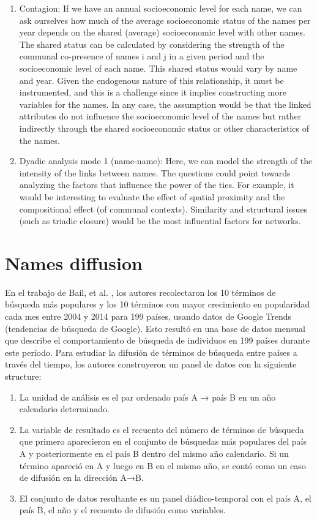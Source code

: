 \begin{enumerate}
    \item Contagion: If we have an annual socioeconomic level for each name, we can ask ourselves how much of the average socioeconomic status of the names per year depends on the shared (average) socioeconomic level with other names. The shared status can be calculated by considering the strength of the communal co-presence of names i and j in a given period and the socioeconomic level of each name. This shared status would vary by name and year. Given the endogenous nature of this relationship, it must be instrumented, and this is a challenge since it implies constructing more variables for the names. In any case, the assumption would be that the linked attributes do not influence the socioeconomic level of the names but rather indirectly through the shared socioeconomic status or other characteristics of the names. 

    \item Dyadic analysis mode 1 (name-name): Here, we can model the strength of the intensity of the links between names. The questions could point towards analyzing the factors that influence the power of the ties. For example, it would be interesting to evaluate the effect of spatial proximity and the compositional effect (of communal contexts). Similarity and structural issues (such as triadic closure) would be the most influential factors for networks. 
    
\end{enumerate}


\section{Names diffusion}

En el trabajo de Bail, et al. \parencite*{bail_prestige_2019}, los autores recolectaron los 10 términos de búsqueda más populares y los 10 términos con mayor crecimiento en popularidad cada mes entre 2004 y 2014 para 199 países, usando datos de Google Trends (tendencias de búsqueda de Google). Esto resultó en una base de datos mensual que describe el comportamiento de búsqueda de individuos en 199 países durante este período. Para estudiar la difusión de términos de búsqueda entre países a través del tiempo, los autores construyeron un panel de datos con la siguiente structure:

\begin{enumerate}
\item La unidad de análisis es el par ordenado país A → país B en un año calendario determinado.
\item La variable de resultado es el recuento del número de términos de búsqueda que primero aparecieron en el conjunto de búsquedas más populares del país A y posteriormente en el país B dentro del mismo año calendario. Si un término apareció en A y luego en B en el mismo año, se contó como un caso de difusión en la dirección A→B.
\item El conjunto de datos resultante es un panel diádico-temporal con el país A, el país B, el año y el recuento de difusión como variables.
\end{enumerate}

